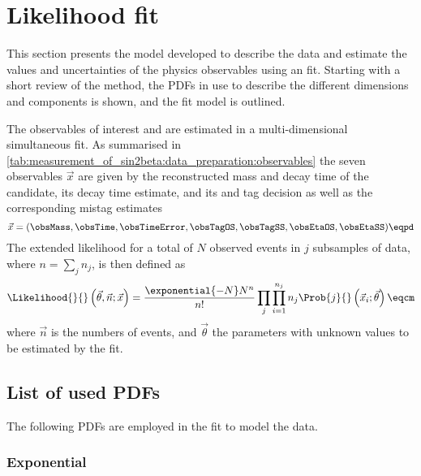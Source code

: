 
\section{Likelihood fit}
\label{sec:measurement_of_sin2beta:likelihood_fit}

This section presents the model developed to describe the data and estimate the
values and uncertainties of the physics observables using an \uEML fit. Starting
with a short review of the \uEML method, the \acp{PDF} in use to describe the
different dimensions and components is shown, and the fit model is outlined.

The \CP observables of interest \SJpsiKS and \CJpsiKS are estimated in a
multi-dimensional simultaneous \uEML fit. As summarised in
\cref{tab:measurement_of_sin2beta:data_preparation:observables} the seven
observables $\vec{x}$ are given by the reconstructed mass and decay time of the
\Bd candidate, its decay time estimate, and its \OS and \SSpi tag decision as
well as the corresponding mistag estimates
%
\begin{equation}\label{eq:measurement_of_sin2beta:likelihood_fit:observables}
  \vec{x} = (\obsMass, \obsTime, \obsTimeError, \obsTagOS, \obsTagSS, \obsEtaOS, \obsEtaSS)\eqpd  
\end{equation}
%
The extended likelihood for a total of $N$ observed events in $j$ subsamples of
data, where $n=\sum_j n_j$, is then defined as
%
\begin{equation}\label{eq:measurement_of_sin2beta:likelihood_fit:uEML}
  \Likelihood{}{}\left(\vec{\theta},\vec{n};\vec{x}\right) = \frac{\exponential{-N} N^n}{n!} \prod_j \prod_{i=1}^{n_j} n_j \Prob{j}{}\left(\vec{x}_i;\vec{\theta}\right)\eqcm
\end{equation}
%
where $\vec{n}$ is the numbers of events, and $\vec{\theta}$ the parameters with
unknown values to be estimated by the \uEML fit. 

\subsection{List of used \aclp{PDF}}
\label{sec:measurement_of_sin2beta:likelihood_fit:pdfs}

The following \acp{PDF} are employed in the fit to model the data.

\subsubsection{Exponential}
\label{sec:measurement_of_sin2beta:likelihood_fit:pdfs:exponential}


